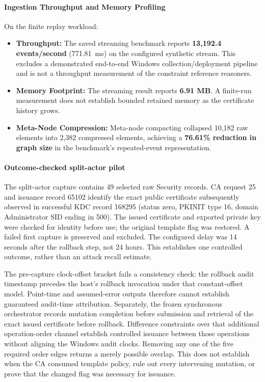 \paragraph{Ingestion Throughput and Memory Profiling}
On the finite replay workload:
\begin{itemize}
    \item \textbf{Throughput:} The saved streaming benchmark reports \textbf{13,192.4 events/second} (771.81~ms) on the configured synthetic stream. This excludes a demonstrated end-to-end Windows collection/deployment pipeline and is not a throughput measurement of the constraint reference reasoners.
    \item \textbf{Memory Footprint:} The streaming result reports \textbf{6.91 MB}. A finite-run measurement does not establish bounded retained memory as the certificate history grows.
    \item \textbf{Meta-Node Compression:} Meta-node compacting collapsed 10,182 raw elements into 2,382 compressed elements, achieving a \textbf{76.61\% reduction in graph size} in the benchmark's repeated-event representation.
\end{itemize}

\paragraph{Outcome-checked split-actor pilot}
The split-actor capture contains 49 selected raw Security records. CA request 25 and issuance record 65102 identify the exact public certificate subsequently observed in successful KDC record 168295 (status zero, PKINIT type 16, domain Administrator SID ending in 500). The issued certificate and exported private key were checked for identity before use; the original template flag was restored. A failed first capture is preserved and excluded. The configured delay was 14 seconds after the rollback step, not 24 hours. This establishes one controlled outcome, rather than an attack recall estimate.

The pre-capture clock-offset bracket fails a consistency check: the rollback audit timestamp precedes the host's rollback invocation under that constant-offset model. Point-time and assumed-error outputs therefore cannot establish guaranteed audit-time attribution. Separately, the frozen synchronous orchestrator records mutation completion before submission and retrieval of the exact issued certificate before rollback. Difference constraints over that additional operation-order channel establish controlled issuance between those operations without aligning the Windows audit clocks. Removing any one of the five required order edges returns a merely possible overlap. This does not establish when the CA consumed template policy, rule out every intervening mutation, or prove that the changed flag was necessary for issuance.

